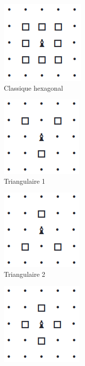         \begin{figure}[H]
            \centering
            \begin{subfigure}{0.22\textwidth}
                \centering
                \includegraphics[scale= 0.35]{img/dep_hexagonal.png}
                \caption{Classique hexagonal}
                \label{fig:dep_hexa}
            \end{subfigure}
            \quad
            \begin{subfigure}{0.2\textwidth}
                \centering
                \includegraphics[scale= 0.35]{img/dep_triangle_1.png}
                \caption{Triangulaire 1}
                \label{fig:dep_tri1}
            \end{subfigure}
            \quad 
            \begin{subfigure}{0.2\textwidth}
                \centering
                \includegraphics[scale= 0.35]{img/dep_triangle_2.png}
                \caption{ Triangulaire 2}
                \label{fig:de_triangulaire 2}
            \end{subfigure}
            \label{label_de_la_figure 3}
            \quad 
             \begin{subfigure}{0.2\textwidth}
                \centering
                \includegraphics[scale= 0.35]{img/dep_carre.png}

\end{subfigure}
\end{figure}
